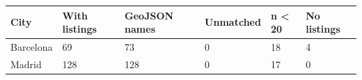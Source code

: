 \begin{tabular}{llllll}
\toprule
City & With listings & GeoJSON names & Unmatched & n < 20 & No listings \\
\midrule
Barcelona & 69 & 73 & 0 & 18 & 4 \\
Madrid & 128 & 128 & 0 & 17 & 0 \\
\bottomrule
\end{tabular}
